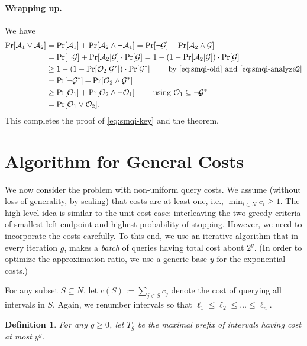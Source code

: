 \documentclass[11pt]{article}
\newcommand{\base}{y}
\newtheorem{defn}[thm]{Definition}
\theoremstyle{remark}
\theoremstyle{plain}
\theoremstyle{remark}
\begin{document}
\paragraph{Wrapping up.} We have
\begin{align*}
    \Pr[{\cal A}_1 \vee {\cal A}_2] &=     \Pr[{\cal A}_1] +     \Pr[{\cal A}_2 \wedge \neg {\cal A}_1] = \Pr[\neg {\cal G}] + \Pr[{\cal A}_2 \wedge  {\cal G}]\\
    & = \Pr[\neg {\cal G}] + \Pr[{\cal A}_2 |{\cal G}]\cdot \Pr[{\cal G}] = 1 - \left( 1 -  \Pr[{\cal A}_2 |{\cal G}]\right) \cdot \Pr[{\cal G}]\\
    & \ge 1 - \left( 1 -  \Pr[{\cal O}_2 |{\cal G}^*]\right) \cdot \Pr[{\cal G}^*]\qquad \text{ by \eqref{eq:smqi-old} and \eqref{eq:smqi-analyze2}}\\
    &= \Pr[\neg {\cal G}^*] + \Pr[{\cal O}_2 \wedge  {\cal G}^*]\\
    & \ge \Pr[{\cal O}_1] +     \Pr[{\cal O}_2 \wedge \neg {\cal O}_1] \qquad \text{ using  }{\cal O}_1\subseteq \neg {\cal G}^* \\
    & =    \Pr[{\cal O}_1 \vee {\cal O}_2].
\end{align*}
This completes the proof of \eqref{eq:smqi-key} and the theorem.



\def\i{g}  \section{Algorithm for  General Costs}


We now consider the \smq problem with non-uniform query costs. We assume (without loss of generality, by scaling) that  costs are at least one, i.e., $\min_{i\in N} c_i\ge 1$. The high-level idea is similar to 
the unit-cost case: interleaving the two greedy criteria of smallest left-endpoint and highest probability of stopping. However, we need to incorporate the costs carefully. To this end, we use an iterative algorithm that in every iteration $\i$, makes  a {\em batch} of queries having total cost about $2^\i$. (In order to optimize the approximation ratio, we use a generic base $\base$ for the exponential costs.)   





For any subset $S\subseteq N$, let $c(S):=\sum_{j\in S} c_j$ denote the cost of querying all  intervals in $S$.  Again, we renumber intervals so that $\ell_1\le \ell_2\le \dots \le \ell_n$.

\begin{defn}
For any $\i\ge 0$, let $T_\i$ be the maximal prefix of intervals having cost at most $ {\base}^\i$.
\end{defn}
\end{document}
